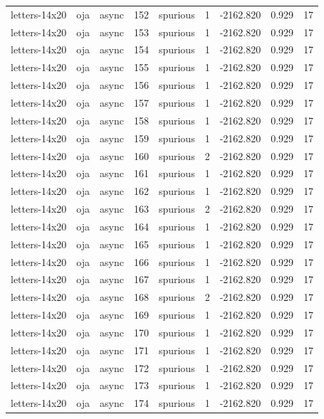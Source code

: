 \begin{tabular}{lllrlrrrr}
letters-14x20 & oja & async & 152 & spurious & 1 & -2162.820 & 0.929 & 17 \\
letters-14x20 & oja & async & 153 & spurious & 1 & -2162.820 & 0.929 & 17 \\
letters-14x20 & oja & async & 154 & spurious & 1 & -2162.820 & 0.929 & 17 \\
letters-14x20 & oja & async & 155 & spurious & 1 & -2162.820 & 0.929 & 17 \\
letters-14x20 & oja & async & 156 & spurious & 1 & -2162.820 & 0.929 & 17 \\
letters-14x20 & oja & async & 157 & spurious & 1 & -2162.820 & 0.929 & 17 \\
letters-14x20 & oja & async & 158 & spurious & 1 & -2162.820 & 0.929 & 17 \\
letters-14x20 & oja & async & 159 & spurious & 1 & -2162.820 & 0.929 & 17 \\
letters-14x20 & oja & async & 160 & spurious & 2 & -2162.820 & 0.929 & 17 \\
letters-14x20 & oja & async & 161 & spurious & 1 & -2162.820 & 0.929 & 17 \\
letters-14x20 & oja & async & 162 & spurious & 1 & -2162.820 & 0.929 & 17 \\
letters-14x20 & oja & async & 163 & spurious & 2 & -2162.820 & 0.929 & 17 \\
letters-14x20 & oja & async & 164 & spurious & 1 & -2162.820 & 0.929 & 17 \\
letters-14x20 & oja & async & 165 & spurious & 1 & -2162.820 & 0.929 & 17 \\
letters-14x20 & oja & async & 166 & spurious & 1 & -2162.820 & 0.929 & 17 \\
letters-14x20 & oja & async & 167 & spurious & 1 & -2162.820 & 0.929 & 17 \\
letters-14x20 & oja & async & 168 & spurious & 2 & -2162.820 & 0.929 & 17 \\
letters-14x20 & oja & async & 169 & spurious & 1 & -2162.820 & 0.929 & 17 \\
letters-14x20 & oja & async & 170 & spurious & 1 & -2162.820 & 0.929 & 17 \\
letters-14x20 & oja & async & 171 & spurious & 1 & -2162.820 & 0.929 & 17 \\
letters-14x20 & oja & async & 172 & spurious & 1 & -2162.820 & 0.929 & 17 \\
letters-14x20 & oja & async & 173 & spurious & 1 & -2162.820 & 0.929 & 17 \\
letters-14x20 & oja & async & 174 & spurious & 1 & -2162.820 & 0.929 & 17 \\

\end{tabular}

